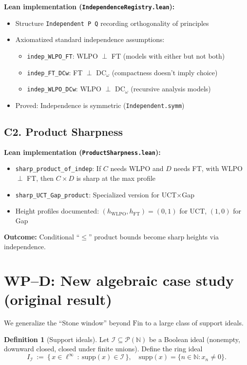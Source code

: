 \documentclass[11pt]{article}
\theoremstyle{definition}
\newtheorem{definition}[theorem]{Definition}
\theoremstyle{remark}
\newcommand{\linf}{\ell^\infty}
\begin{document}
\textbf{Lean implementation (\texttt{IndependenceRegistry.lean}):}
\begin{itemize}
\item Structure \texttt{Independent P Q} recording orthogonality of principles
\item Axiomatized standard independence assumptions:
  \begin{itemize}
  \item \texttt{indep\_WLPO\_FT}: WLPO $\perp$ FT (models with either but not both)
  \item \texttt{indep\_FT\_DCw}: FT $\perp$ DC$_\omega$ (compactness doesn't imply choice)
  \item \texttt{indep\_WLPO\_DCw}: WLPO $\perp$ DC$_\omega$ (recursive analysis models)
  \end{itemize}
\item Proved: Independence is symmetric (\texttt{Independent.symm})
\end{itemize}

\subsection{C2. Product Sharpness}

\textbf{Lean implementation (\texttt{ProductSharpness.lean}):}
\begin{itemize}
\item \texttt{sharp\_product\_of\_indep}: If $C$ needs WLPO and $D$ needs FT, with WLPO $\perp$ FT, then $C \times D$ is sharp at the max profile
\item \texttt{sharp\_UCT\_Gap\_product}: Specialized version for UCT$\times$Gap
\item Height profiles documented: $(h_{\text{WLPO}}, h_{\text{FT}}) = (0, 1)$ for UCT, $(1, 0)$ for Gap
\end{itemize}

\textbf{Outcome:} Conditional ``$\leq$'' product bounds become sharp heights via independence.

\section{WP–D: New algebraic case study (original result)}

We generalize the “Stone window” beyond \(\mathrm{Fin}\) to a large class of support ideals.

\begin{definition}[Support ideals]
Let \(\mathcal I\subseteq \mathcal P(\mathbb N)\) be a Boolean ideal (nonempty, downward closed, closed under finite unions).
Define the ring ideal
\[
I_{\mathcal I}\ :=\ \{\,x\in \linf\ :\ \mathrm{supp}(x)\in\mathcal I\,\},
\quad
\mathrm{supp}(x)=\{n\in\mathbb N: x_n\neq 0\}.
\]
\end{definition}
\end{document}
